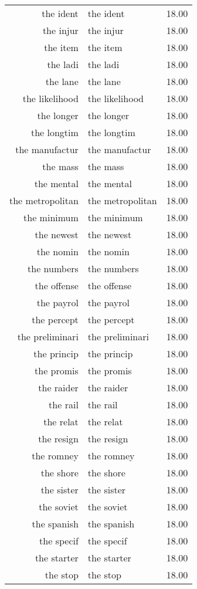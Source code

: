 \begin{table}[ht]
\begin{tabular}{rlr}
  the ident & the ident & 18.00 \\ 
  the injur & the injur & 18.00 \\ 
  the item & the item & 18.00 \\ 
  the ladi & the ladi & 18.00 \\ 
  the lane & the lane & 18.00 \\ 
  the likelihood & the likelihood & 18.00 \\ 
  the longer & the longer & 18.00 \\ 
  the longtim & the longtim & 18.00 \\ 
  the manufactur & the manufactur & 18.00 \\ 
  the mass & the mass & 18.00 \\ 
  the mental & the mental & 18.00 \\ 
  the metropolitan & the metropolitan & 18.00 \\ 
  the minimum & the minimum & 18.00 \\ 
  the newest & the newest & 18.00 \\ 
  the nomin & the nomin & 18.00 \\ 
  the numbers & the numbers & 18.00 \\ 
  the offense & the offense & 18.00 \\ 
  the payrol & the payrol & 18.00 \\ 
  the percept & the percept & 18.00 \\ 
  the preliminari & the preliminari & 18.00 \\ 
  the princip & the princip & 18.00 \\ 
  the promis & the promis & 18.00 \\ 
  the raider & the raider & 18.00 \\ 
  the rail & the rail & 18.00 \\ 
  the relat & the relat & 18.00 \\ 
  the resign & the resign & 18.00 \\ 
  the romney & the romney & 18.00 \\ 
  the shore & the shore & 18.00 \\ 
  the sister & the sister & 18.00 \\ 
  the soviet & the soviet & 18.00 \\ 
  the spanish & the spanish & 18.00 \\ 
  the specif & the specif & 18.00 \\ 
  the starter & the starter & 18.00 \\ 
  the stop & the stop & 18.00 \\ 

\end{tabular}
\end{table}
